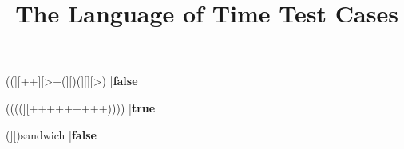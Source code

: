 \documentclass{../../codeproblem}
\begin{document}
\title{The Language of Time Test Cases}

\begin{example}
((][++][>+(][)(][][>(][){
|\textbf{true}\end{example}

\begin{example}
((][++][>+(][)(][][>)
|\textbf{false}\end{example}

\begin{example}
((((][+++++++++))))
|\textbf{true}\end{example}

\begin{example}
(][)sandwich
|\textbf{false}\end{example}
\end{document}
